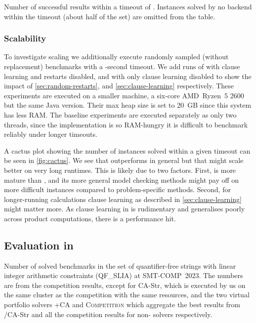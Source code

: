 \begin{table}
  \caption{Number of successful results within a timeout of \RuntimeTimeout{}.
  Instances solved by no backend within the timeout (about half of the set) are
  omitted from the table.}\label{tab:solve-status}
  \begin{center}
  
  \end{center}
\end{table}

\subsubsection{Scalability}\label{sec:scaling}%
To investigate scaling we additionally execute  randomly sampled
(without replacement) benchmarks with a -second timeout. We add
runs of \Calculus{} with clause learning and restarts disabled, and with only
clause learning disabled to show the impact of \cref{sec:random-restarts}, and
\cref{sec:clause-learning} respectively. These experiments are executed on a smaller
machine, a six-core AMD~Ryzen~5 2600 but the same Java version. Their max
heap size is set to \SI{20}{GB} since this system has less RAM. The baseline
experiments are executed separately as only two threads, since the implementation is
so RAM-hungry it is difficult to benchmark reliably under longer timeouts.

A cactus plot showing the number of instances solved within a given timeout can
be seen in \cref{fig:cactus}. We see that \Calculus{} outperforms \Nuxmv{} in
general but that \Nuxmv{} might scale better on very long runtimes. This is
likely due to two factors. First, \Nuxmv{} is more mature than \Calculus{}, and
its more general model checking methods might pay off on more difficult
instances compared to problem-specific methods. Second, for longer-running
calculations clause learning as described in \cref{sec:clause-learning} might
matter more. As clause learning in \Catra{} is rudimentary and generalises
poorly across product computations, there is a performance hit.

\subsection{Evaluation in \Ostrich{}}\label{}%

\begin{table}
  \caption{Number of solved benchmarks in the set of quantifier-free strings with
  linear integer arithmetic constraints (QF\_SLIA) at SMT-COMP~2023. The numbers are from
  the competition results, except for CA-Str, which is executed by us on the same 
  cluster as the competition with the same resources, and the two virtual portfolio solvers
  \Ostrich+CA and \textsc{Competition} which aggregate the best results from \Ostrich{}/CA-Str and 
  all the competition results for non-\Ostrich{} solvers respectively. }\label{tab:solve-status-smt-comp}
  \begin{center}
  
  \end{center}
\end{table}

